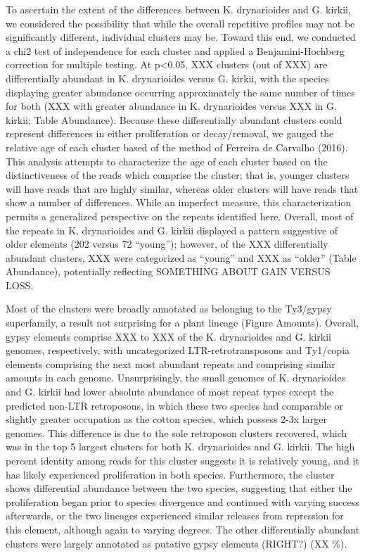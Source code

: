 \documentclass[10pt,letterpaper]{article}
\newcommand{\note}[2][]{\added[id=#1,remark={#2}]{}}
\begin{document}
To ascertain the extent of the differences between K. drynarioides and G.
kirkii, we considered the possibility that while the overall repetitive profiles
may not be significantly different, individual clusters may be. Toward this end,
we conducted a chi2 test of independence for each cluster and applied a
Benjamini-Hochberg correction for multiple testing. At p<0.05, XXX clusters (out
of XXX) are differentially abundant in K. drynarioides versus G. kirkii, with
the species displaying greater abundance occurring approximately the same number
of times for both (XXX with greater abundance in K. drynarioides versus XXX in
G. kirkii; Table Abundance). Because these differentially abundant clusters
could represent differences in either proliferation or decay/removal, we gauged
the relative age of each cluster based of the method of Ferreira de Carvalho
(2016). This analysis attempts to characterize the age of each
cluster\note[Corrinne]{should we redo this just for the Kok/Kirk reads? would
  the A-genome reads, minimally, be biasing some of these toward "youth"?} based
on the distinctiveness of the reads which comprise the cluster; that is, younger
clusters will have reads that are highly similar, whereas older clusters will
have reads that show a number of differences. While an imperfect measure, this
characterization permits a generalized perspective on the repeats identified
here. Overall, most of the repeats in K. drynarioides and G. kirkii displayed a
pattern suggestive of older elements (202 versus 72 “young”); however, of the
XXX differentially abundant clusters, XXX were categorized as “young” and XXX as
“older” (Table Abundance), potentially reflecting SOMETHING ABOUT GAIN VERSUS
LOSS.

Most of the clusters were broadly annotated as belonging to the Ty3/gypsy
superfamily, a result not surprising for a plant lineage (Figure Amounts).
Overall, gypsy elements comprise XXX to XXX of the K. drynarioides and G. kirkii
genomes, respectively, with uncategorized LTR-retrotransposons and Ty1/copia
elements comprising the next most abundant repeats and comprising similar
amounts in each genome. Unsurprisingly, the small genomes of K. drynarioides and
G. kirkii had lower absolute abundance of most repeat types except the predicted
non-LTR retroposons, in which these two species had comparable or slightly
greater occupation as the cotton species, which possess 2-3x larger genomes.
This difference is due to the sole retroposon clusters recovered, which was in
the top 5 largest clusters for both K. drynarioides and G. kirkii. The high
percent identity among reads for this cluster suggests it is relatively young,
and it has likely experienced proliferation in both species. Furthermore, the
cluster shows differential abundance between the two species, suggesting that
either the proliferation began prior to species divergence and continued with
varying success afterwards, or the two lineages experienced similar releases
from repression for this element, although again to varying degrees. The other
differentially abundant clusters were largely annotated as putative gypsy
elements (RIGHT?) (XX \%).
\end{document}
